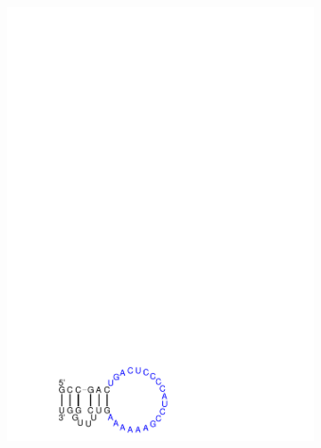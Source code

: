 \begin{figure}[t!H]
\begin{subfigure}[t]{0.3\textwidth}
    \includegraphics[clip, trim=0 -2cm 7cm 20cm, width=1\textwidth]{../img/alg/insert/3/multibranch-del}
    \caption{}
    \label{obr:delete_insert_multibranch_loop_b}
  \end{subfigure}
  \begin{subfigure}[t]{0.3\textwidth}

\end{subfigure}
\end{figure}
